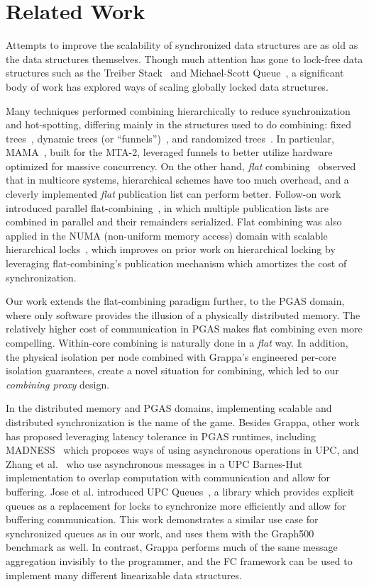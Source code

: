 \section{Related Work}
Attempts to improve the scalability of synchronized data structures are as old as the data structures themselves. Though much attention has gone to lock-free data structures such as the Treiber Stack~\cite{treiber} and Michael-Scott Queue~\cite{msqueue}, a significant body of work has explored ways of scaling globally locked data structures.

Many techniques performed combining hierarchically to reduce synchronization and hot-spotting, differing mainly in the structures used to do combining: fixed trees~\cite{yew:combining-trees}, dynamic trees (or ``funnels'')~\cite{funnels,MAMA}, and randomized trees~\cite{edtrees}. In particular, MAMA~\cite{MAMA}, built for the MTA-2, leveraged funnels to better utilize hardware optimized for massive concurrency.
On the other hand, \emph{flat} combining~\cite{flatCombining} observed that in multicore systems, hierarchical schemes have too much overhead, and a cleverly implemented \emph{flat} publication list can perform better.
Follow-on work introduced parallel flat-combining~\cite{scalableFCQueues}, in which multiple publication lists are combined in parallel and their remainders serialized.
Flat combining was also applied in the NUMA (non-uniform memory access) domain with scalable hierarchical locks~\cite{fcNUMALocks}, which improves on prior work on hierarchical locking by leveraging flat-combining's publication mechanism which amortizes the cost of synchronization.

Our work extends the flat-combining paradigm further, to the PGAS domain, where only software provides the illusion of a physically distributed memory. The relatively higher cost of communication in PGAS makes flat combining even more compelling. Within-core combining is naturally done in a \emph{flat} way. In addition, the physical isolation per node combined with Grappa's engineered per-core isolation guarantees, create a novel situation for combining, which led to our \emph{combining proxy} design.

In the distributed memory and PGAS domains, implementing scalable and distributed synchronization is the name of the game.
Besides Grappa, other work has proposed leveraging latency tolerance in PGAS runtimes, including MADNESS~\cite{shet:async-upc} which proposes ways of using asynchronous operations in UPC, and Zhang et al.~\cite{zhang:barnes-hut} who use asynchronous messages in a UPC Barnes-Hut implementation to overlap computation with communication and allow for buffering.
Jose et al. introduced UPC Queues~\cite{jose:upc-queues}, a library which provides explicit queues as a replacement for locks to synchronize more efficiently and allow for buffering communication. This work demonstrates a similar use case for synchronized queues as in our work, and uses them with the Graph500 benchmark as well. In contrast, Grappa performs much of the same message aggregation invisibly to the programmer, and the FC framework can be used to implement many different linearizable data structures.

